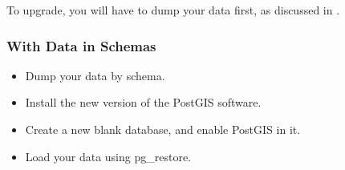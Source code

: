 \documentclass[a4paper,11pt,english]{sphinxmanual}
\begin{document}
To upgrade, you will have to dump your data first, as discussed in {\hyperref[\detokenize{maintenance:backup}]{}}.


\subsubsection{With Data in Schemas}
\label{\detokenize{maintenance:with-data-in-schemas}}\begin{itemize}
\item {} 
Dump your data by schema.

\begin{sphinxVerbatim}[commandchars=\\\{\}]
\end{sphinxVerbatim}

\item {} 
Install the new version of the PostGIS software.

\item {} 
Create a new blank database, and enable PostGIS in it.

\item {} 
Load your data using pg\_restore.

\begin{sphinxVerbatim}[commandchars=\\\{\}]
\end{sphinxVerbatim}

\end{itemize}
\end{document}
